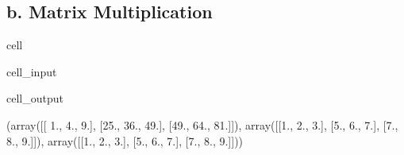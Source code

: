 \documentclass[letterpaper,10pt,english]{jupyterBook}
\begin{document}
\subsection{b. Matrix Multiplication}
\label{\detokenize{lessons/Intro_to_Matrices_in_NumPy:b-matrix-multiplication}}
\begin{sphinxuseclass}{cell}\begin{sphinxVerbatimInput}

\begin{sphinxuseclass}{cell_input}
\begin{sphinxVerbatim}[commandchars=\\\{\}]
    

   
    

  
\end{sphinxVerbatim}

\end{sphinxuseclass}\end{sphinxVerbatimInput}
\begin{sphinxVerbatimOutput}

\begin{sphinxuseclass}{cell_output}
\begin{sphinxVerbatim}[commandchars=\\\{\}]
(array([[ 1.,  4.,  9.],
        [25., 36., 49.],
        [49., 64., 81.]]),
 array([[1., 2., 3.],
        [5., 6., 7.],
        [7., 8., 9.]]),
 array([[1., 2., 3.],
        [5., 6., 7.],
        [7., 8., 9.]]))
\end{sphinxVerbatim}

\end{sphinxuseclass}\end{sphinxVerbatimOutput}

\end{sphinxuseclass}
\end{document}
